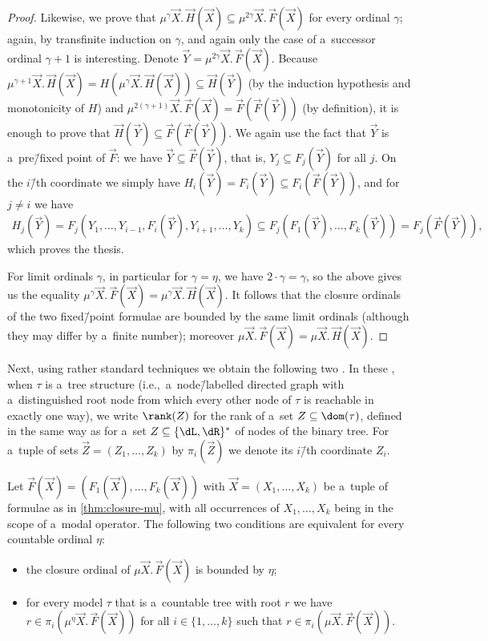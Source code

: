 \begin{proof}
	Likewise, we prove that $\mu^\gamma\vec{X}.\,\vec{H}(\vec{X})\subseteq\mu^{2\gamma}\vec{X}.\,\vec{F}(\vec{X})$ for every ordinal $\gamma$; again, by transfinite induction on $\gamma$,
	and again only the case of a~successor ordinal $\gamma+1$ is interesting.
	Denote $\vec{Y}=\mu^{2\gamma}\vec{X}.\,\vec{F}(\vec{X})$.
	Because $\mu^{\gamma+1}\vec{X}.\,\vec{H}(\vec{X})=H(\mu^\gamma\vec{X}.\,\vec{H}(\vec{X}))\subseteq \vec{H}(\vec{Y})$ (by the induction hypothesis and monotonicity of $H$)
	and $\mu^{2(\gamma+1)}\vec{X}.\,\vec{F}(\vec{X})=\vec{F}(\vec{F}(\vec{Y}))$ (by definition), it is enough to prove that $\vec{H}(\vec{Y})\subseteq\vec{F}(\vec{F}(\vec{Y}))$.
	We again use the fact that $\vec{Y}$ is a~pre\=/fixed point of $\vec{F}$: we have $\vec{Y}\subseteq\vec{F}(\vec{Y})$, that is, $Y_j\subseteq F_j(\vec{Y})$ for all $j$.
	On the $i$\=/th coordinate we simply have $H_i(\vec{Y})=F_i(\vec{Y})\subseteq F_i(\vec{F}(\vec{Y}))$,
	and for $j\neq i$ we have
	\begin{align*}
		H_j(\vec{Y})=F_j(Y_1,\dots,Y_{i-1},F_i(\vec{Y}),Y_{i+1},\dots,Y_k)\subseteq F_j(F_1(\vec{Y}),\dots,F_k(\vec{Y}))=F_j(\vec{F}(\vec{Y})),
	\end{align*}
	which proves the thesis.
	
	For limit ordinals $\gamma$, in particular for $\gamma=\eta$, we have $2\cdot\gamma=\gamma$, so the above gives us the equality $\mu^\gamma\vec{X}.\,\vec{F}(\vec{X})=\mu^\gamma\vec{X}.\,\vec{H}(\vec{X})$.
	It follows that the closure ordinals of the two fixed\=/point formulae are bounded by the same limit ordinals (although they may differ by a~finite number);
	moreover $\mu\vec{X}.\,\vec{F}(\vec{X})=\mu\vec{X}.\,\vec{H}(\vec{X})$.
\end{proof}

Next, using rather standard techniques we obtain the following two .
In these , when $\tau$ is a~tree structure (i.e.,~a~node\=/labelled directed graph with a~distinguished root node from which every other node of $\tau$ is reachable in exactly one way),
we write $\rank(Z)$ for the rank of a~set $Z\subseteq\dom(\tau)$, defined in the same way as for a~set $Z\subseteq\{\dL,\dR\}^\ast$ of nodes of the binary tree.
For a~tuple of sets $\vec{Z}=(Z_1,\dots,Z_k)$ by $\pi_i(\vec{Z})$ we denote its $i$\=/th coordinate $Z_i$.

\begin{lem}\label{lem:mu-tree1}
	Let $\vec{F}(\vec{X})=(F_1(\vec{X}),\dots,F_k(\vec{X}))$ with $\vec{X}=(X_1,\dots,X_k)$ be a~tuple of formulae as in \cref{thm:closure-mu}, with all occurrences of $X_1,\dots,X_k$ being in the scope of a~modal operator.
	The following two conditions are equivalent for every countable ordinal $\eta$:
	\begin{itemize}
	\item	the closure ordinal of $\mu \vec{X}.\,\vec{F}(\vec{X})$ is bounded by $\eta$;
	\item	for every model $\tau$ that is a~countable tree with root $r$ we have $r\in\pi_i(\mu^\eta\vec{X}.\,\vec{F}(\vec{X}))$ for all $i\in\{1,\dots,k\}$ such that $r\in\pi_i(\mu \vec{X}.\,\vec{F}(\vec{X}))$.
	\end{itemize}
\end{lem}


